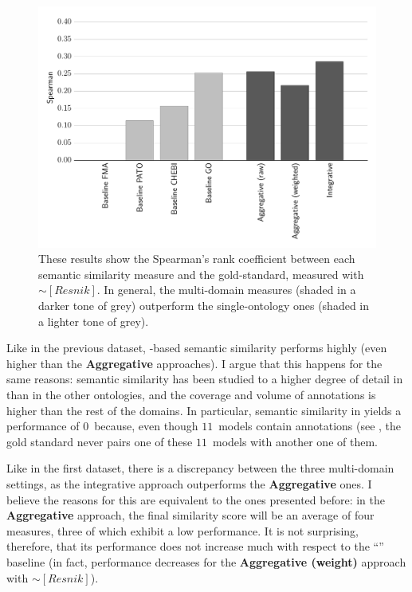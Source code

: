 \begin{figure}
    \centering
    \includegraphics[width=0.9\linewidth]{images/biomodels-resnik.pdf}
    \caption[Semantic similarity in the Biochemical Models dataset with~{\boldmath$\protect\sim[Resnik]$}]{These results show the Spearman's rank coefficient between each semantic similarity measure and the gold-standard, measured with $\sim[Resnik]$. In general, the multi-domain measures (shaded in a darker tone of grey) outperform the single-ontology ones (shaded in a lighter tone of grey).}
    \label{fig:biomodels}
\end{figure}

Like in the previous dataset, -based semantic similarity performs highly (even higher than the \textbf{Aggregative} approaches). I argue that this happens for the same reasons: semantic similarity has been studied to a higher degree of detail in  than in the other ontologies, and the coverage and volume of  annotations is higher than the rest of the domains. In particular, semantic similarity in  yields a performance of $0$~because, even though $11$~models contain  annotations (see , the gold standard never pairs one of these $11$~models with another one of them.

Like in the first dataset, there is a discrepancy between the three multi-domain settings, as the integrative approach outperforms the \textbf{Aggregative} ones. I believe the reasons for this are equivalent to the ones presented before: in the \textbf{Aggregative} approach, the final similarity score will be an average of four measures, three of which exhibit a low performance. It is not surprising, therefore, that its performance does not increase much with respect to the ``'' baseline (in fact, performance decreases for the \textbf{Aggregative (weight)} approach with $\sim[Resnik]$).

